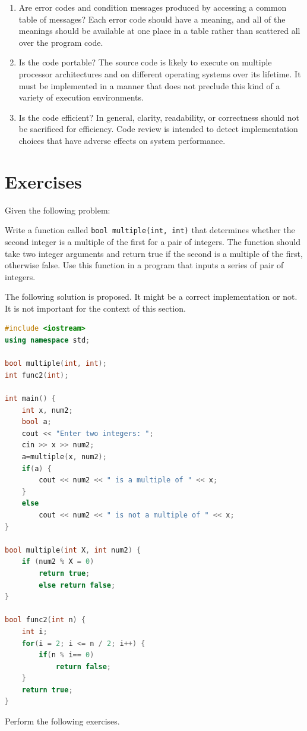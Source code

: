 \begin{enumerate}
    \item Are error codes and condition messages produced by accessing a common table of messages? Each error code should have a meaning, and all of the meanings should be available at one place in a table rather than scattered all over the program code.
    \item Is the code portable? The source code is likely to execute on multiple processor architectures and on different operating systems over its lifetime. It must be implemented in a manner that does not preclude this kind of a variety of execution environments.
    \item Is the code efficient? In general, clarity, readability, or correctness should not be sacrificed for efficiency. Code review is intended to detect implementation choices that have adverse effects on system performance.
\end{enumerate}

\section{Exercises}
Given the following problem:
\begin{displayquote}
    Write a function called \lstinline!bool multiple(int, int)! that determines whether the second integer is a multiple of the first for a pair of integers. The function should take two integer arguments and return true if the second is a multiple of the first, otherwise false. Use this function in a program that inputs a series of pair of integers.
\end{displayquote}
The following solution is proposed. It might be a correct implementation or not. It is not important for the context of this section.
\begin{lstlisting}[language=C++,caption={A \CC~program that confirms a number is multiple of another.}]
#include <iostream>
using namespace std;

bool multiple(int, int);
int func2(int);

int main() {
    int x, num2;
    bool a;
    cout << "Enter two integers: ";
    cin >> x >> num2;
    a=multiple(x, num2);
    if(a) {
        cout << num2 << " is a multiple of " << x;
    }
    else
        cout << num2 << " is not a multiple of " << x;
}

bool multiple(int X, int num2) {
    if (num2 % X = 0)
        return true;
        else return false;
}

bool func2(int n) {
    int i;
    for(i = 2; i <= n / 2; i++) {
        if(n % i== 0)
            return false;
    }
    return true;
}
\end{lstlisting}
Perform the following exercises.

